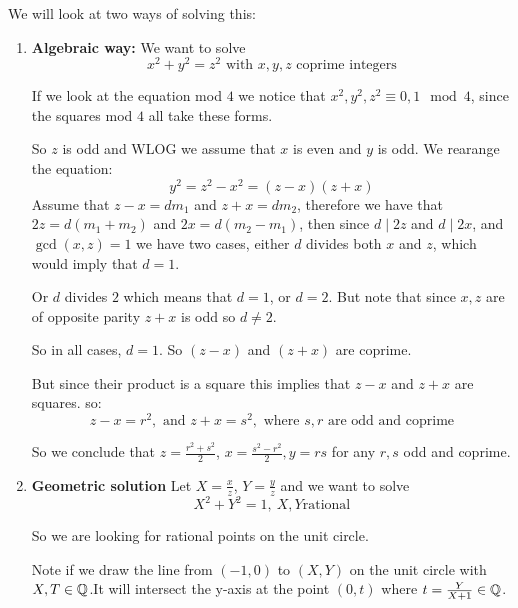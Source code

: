 We will look at two ways of solving this:\begin{enumerate}
    \item \textbf{Algebraic way:} 
    We want to solve\begin{equation}
        x^2+y^2 = z^2 \text{ with }x,y,z\text{ coprime integers}
    \end{equation}
    
    If we look at the equation mod $4$ we notice that $x^2,y^2,z^2 \equiv 0,1 \mod 4$, since the squares mod $4$ all take these forms.
    
    So $z$ is odd and WLOG we assume that $x$ is even and $y$ is odd. 
    We rearange the equation:\begin{equation}
        y^2 = z^2-x^2 = (z-x)(z+x)
    \end{equation}
    Assume that $z-x = dm_1$ and $z+x = dm_2$, therefore we have that $2z = d(m_1+m_2)$ and $2x = d(m_2-m_1)$, then since $d\mid 2z$ and $d\mid 2x$, and $\gcd(x,z) = 1$ we have two cases, either $d$ divides both $x$ and $z$, which would imply that $d=1$.
    
    Or $d$ divides $2$ which means that $d = 1$, or $d=2$. But note that since $x,z$ are of opposite parity $z+x$ is odd so $d\neq 2$.
    
    So in all cases, $d = 1$. So $(z-x)$ and $(z+x)$ are coprime.
    
    But since their product is a square this implies that $z-x$ and $z+x$ are squares. so:\begin{equation}
        z-x = r^2, \text{ and }z+x = s^2, \text{ where }s,r\text{ are odd and coprime}
    \end{equation}
    
    So we conclude that $z = \frac{r^2+s^2}{2}$, $x = \frac{s^2-r^2}{2}, y=rs $ for any $r,s$ odd and coprime.
    
    \item \textbf{Geometric solution}
    Let $X = \frac{x}{z}$, $Y = \frac{y}{z}$ and we want to solve\begin{equation}
        X^2+Y^2=1, \ X,Y\text{rational}
    \end{equation}
    
    So we are looking for rational points on the unit circle.
    
    Note if we draw the line from $(-1,0)$ to $(X,Y)$ on the unit circle with $X,T\in \mathbb{Q}$.It will intersect the y-axis at the point $(0,t)$ where $t=\frac{Y}{X+1}\in \mathbb{Q}$.
    

\end{enumerate}
